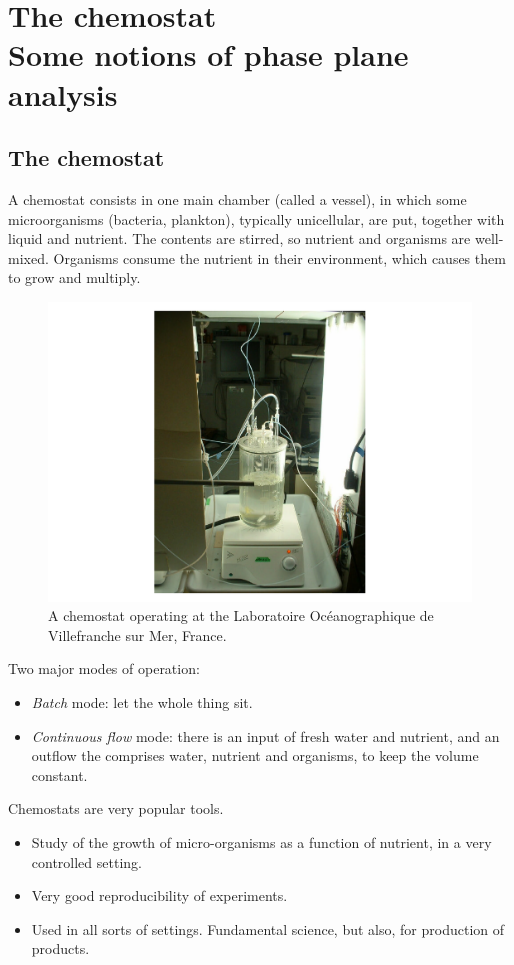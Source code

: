\chapter[Chemostat]{The chemostat\\[0.5cm] Some notions of phase plane analysis}
\label{chap:chemostat}



\section{The chemostat}

A chemostat consists in one main chamber (called a vessel), in which some microorganisms (bacteria, plankton), typically unicellular, are put, together with liquid and nutrient.
The contents are stirred, so nutrient and organisms are well-mixed.
Organisms consume the nutrient in their environment, which causes them to grow and multiply.
\begin{figure}[htbp]
\begin{center}
\includegraphics[height=0.45\textheight]
{../figs_05_chemostat/chemostat}
\caption{A chemostat operating at the Laboratoire
Oc\'eanographique de Villefranche sur Mer, France.}
\end{center}
\end{figure}
Two major modes of operation:
\begin{itemize}
\item \emph{Batch} mode: let the whole thing sit.
\item \emph{Continuous flow} mode: there is an input of fresh water and nutrient, and an outflow the comprises water, nutrient and organisms, to keep the volume constant.
\end{itemize}
Chemostats are very popular tools.
\begin{itemize}
\item Study of the growth of micro-organisms as a function of nutrient, in a very controlled setting.
\item Very good reproducibility of experiments.
\item Used in all sorts of settings. Fundamental science, but also, for production of products.
\end{itemize}


